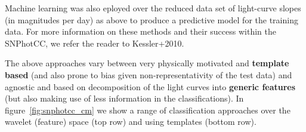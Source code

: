 Machine learning was also eployed over the reduced data set of light-curve slopes (in magnitudes per day) as above to produce a predictive model for the training data. For more information on these methods and their success within the SNPhotCC, we refer the reader to Kessler+2010.

The above approaches vary between very physically motivated and \textbf{template based} (and also prone to bias given non-representativity of the test data) and agnostic and based on decomposition of the light curves into \textbf{generic features} (but also making use of less information in the classifications).
In figure~\ref{fig:snphotcc_cm} we show a range of classification approaches over the wavelet (feature) space (top row) and using templates (bottom row).


